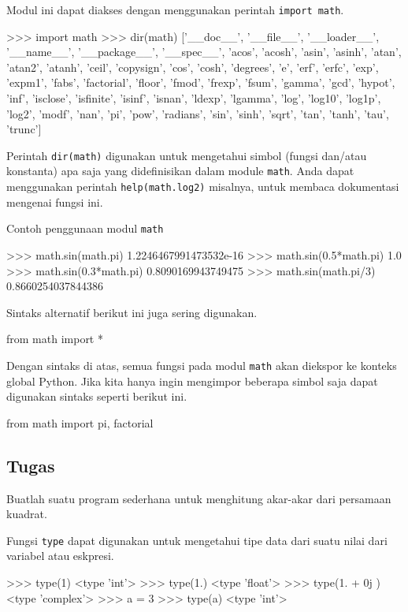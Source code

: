 \documentclass[a4paper,11pt]{extarticle}
\begin{document}
Modul ini dapat diakses dengan menggunakan perintah \texttt{import math}.
\begin{pyconcode}
>>> import math
>>> dir(math)
['__doc__', '__file__', '__loader__', '__name__', '__package__', '__spec__', 'acos', 'acosh', 'asin', 'asinh', 'atan', 'atan2', 'atanh', 'ceil', 'copysign', 'cos', 'cosh', 'degrees', 'e', 'erf', 'erfc', 'exp', 'expm1', 'fabs', 'factorial', 'floor', 'fmod', 'frexp', 'fsum', 'gamma', 'gcd', 'hypot', 'inf', 'isclose', 'isfinite', 'isinf', 'isnan', 'ldexp', 'lgamma', 'log', 'log10', 'log1p', 'log2', 'modf', 'nan', 'pi', 'pow', 'radians', 'sin', 'sinh', 'sqrt', 'tan', 'tanh', 'tau', 'trunc']
\end{pyconcode}

Perintah \texttt{dir(math)} digunakan untuk mengetahui simbol
(fungsi dan/atau konstanta) apa saja yang
didefinisikan dalam module \texttt{math}. Anda dapat menggunakan perintah
\texttt{help(math.log2)} misalnya, untuk membaca dokumentasi mengenai fungsi ini.

Contoh penggunaan modul \texttt{math}
\begin{pyconcode}
>>> math.sin(math.pi)
1.2246467991473532e-16
>>> math.sin(0.5*math.pi)
1.0
>>> math.sin(0.3*math.pi)
0.8090169943749475
>>> math.sin(math.pi/3)
0.8660254037844386
\end{pyconcode}

Sintaks alternatif berikut ini juga sering digunakan.
\begin{pythoncode}
from math import *
\end{pythoncode}
Dengan sintaks di atas, semua fungsi pada modul \texttt{math} akan diekspor ke
konteks global Python.
Jika kita hanya ingin mengimpor beberapa simbol saja dapat digunakan
sintaks seperti berikut ini.
\begin{pythoncode}
from math import pi, factorial
\end{pythoncode}


\subsection*{Tugas}

Buatlah suatu program sederhana untuk menghitung akar-akar dari
persamaan kuadrat.



Fungsi \texttt{type} dapat digunakan untuk mengetahui tipe data dari
suatu nilai dari variabel atau eskpresi.
\begin{pyconcode}
>>> type(1)
<type 'int'>
>>> type(1.)
<type 'float'>
>>> type(1. + 0j )
<type 'complex'>
>>> a = 3
>>> type(a)
<type 'int'>
\end{pyconcode}
\end{document}
